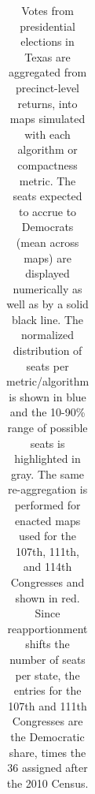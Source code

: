 \begin{table}
\begin{tabular}{l rm{7em} rm{7em} rm{7em} rm{7em}}
\hline \hline
\end{tabular}
\caption{Votes from presidential elections in Texas are aggregated from precinct-level returns, into maps simulated with each algorithm or compactness metric. 
             The seats expected to accrue to Democrats (mean across maps) are displayed numerically as well as by a solid black line.
             The normalized distribution of seats per metric/algorithm is shown in blue and the 10-90\% range of possible seats is highlighted in gray.
             The same re-aggregation is performed for enacted maps used for the 107th, 111th, and 114th Congresses and shown in red.
             Since reapportionment shifts the number of seats per state,
               the entries for the 107th and 111th Congresses are the Democratic share,
               times the 36 assigned after the 2010 Census.
             }\label{tab:TX_senate_seats}
\end{table}
 